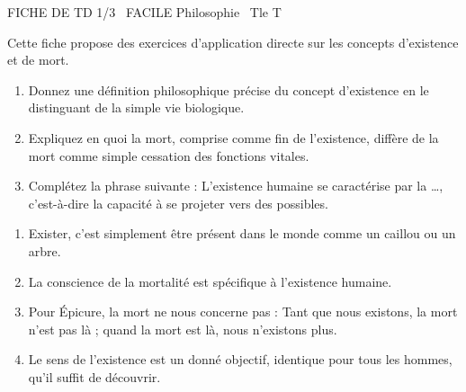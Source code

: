 \documentclass[11pt]{article}
\begin{document}
\begin{tcolorbox}[enhanced,colback=popink,colframe=popink,arc=10pt,boxrule=0pt,left=12pt,right=12pt,top=9pt,bottom=9pt]
{\color{white}\popxbold\small FICHE DE TD 1/3 \textbullet\ FACILE \hfill Philosophie \textbullet\ Tle T\par}
\end{tcolorbox}
\vspace{4pt}
Cette fiche propose des exercices d'application directe sur les concepts d'existence et de mort.

\begin{exercice}
\begin{enumerate}
    \item Donnez une définition philosophique précise du concept d'\og existence \fg en le distinguant de la simple vie biologique.
    \item Expliquez en quoi la mort, comprise comme fin de l'existence, diffère de la mort comme simple cessation des fonctions vitales.
    \item Complétez la phrase suivante : \og L'existence humaine se caractérise par la \ldots{}, c'est-à-dire la capacité à se projeter vers des possibles. \fg
\end{enumerate}
\end{exercice}

\begin{exercice}
\begin{enumerate}
    \item \og Exister, c'est simplement être présent dans le monde comme un caillou ou un arbre. \fg
    \item \og La conscience de la mortalité est spécifique à l'existence humaine. \fg
    \item \og Pour Épicure, la mort ne nous concerne pas : \og Tant que nous existons, la mort n'est pas là ; quand la mort est là, nous n'existons plus. \fg \fg
    \item \og Le \og sens de l'existence \fg est un donné objectif, identique pour tous les hommes, qu'il suffit de découvrir. \fg
\end{enumerate}
\end{exercice}
\end{document}
